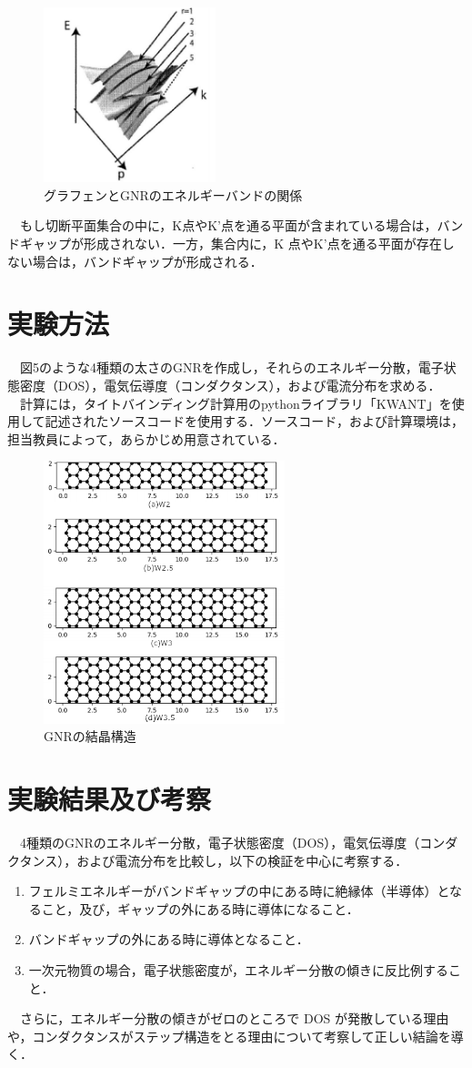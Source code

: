 \begin{figure}[H]
  \centering
  \includegraphics[width=5cm]{./imgs/4.png}
  \caption{グラフェンとGNRのエネルギーバンドの関係}
\end{figure}

　もし切断平面集合の中に，K点やK’点を通る平面が含まれている場合は，バンドギャップが形成されない．一方，集合内に，K 点やK’点を通る平面が存在しない場合は，バンドギャップが形成される．

\section{実験方法}
　図5のような4種類の太さのGNRを作成し，それらのエネルギー分散，電子状態密度（DOS），電気伝導度（コンダクタンス），および電流分布を求める．\\
　計算には，タイトバインディング計算用のpythonライブラリ「KWANT」を使用して記述されたソースコードを使用する．ソースコード，および計算環境は，担当教員によって，あらかじめ用意されている．
\begin{figure}[H]
  \centering
  \includegraphics[width=7cm]{./imgs/5.png}
  \caption{GNRの結晶構造}
\end{figure}

\section{実験結果及び考察}
　4種類のGNRのエネルギー分散，電子状態密度（DOS），電気伝導度（コンダクタンス），および電流分布を比較し，以下の検証を中心に考察する．
\begin{enumerate}
  \item フェルミエネルギーがバンドギャップの中にある時に絶縁体（半導体）となること，及び，ギャップの外にある時に導体になること．
  \item バンドギャップの外にある時に導体となること．
  \item 一次元物質の場合，電子状態密度が，エネルギー分散の傾きに反比例すること．
\end{enumerate}

　さらに，エネルギー分散の傾きがゼロのところで DOS が発散している理由や，コンダクタンスがステップ構造をとる理由について考察して正しい結論を導く．



